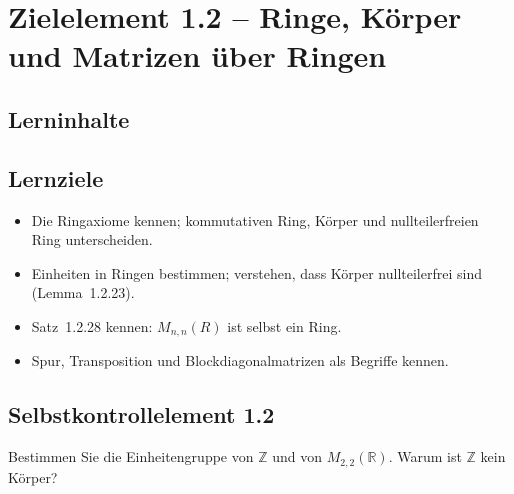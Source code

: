 \documentclass[a4paper,12pt]{article}
\begin{document}
\section*{Zielelement 1.2 -- Ringe, Körper und Matrizen über Ringen}

\subsection*{Lerninhalte}
\begin{center}
\end{center}

\subsection*{Lernziele}
\begin{itemize}
  \item Die Ringaxiome kennen; kommutativen Ring, Körper und nullteilerfreien Ring unterscheiden.
  \item Einheiten in Ringen bestimmen; verstehen, dass Körper nullteilerfrei sind (Lemma~1.2.23).
  \item Satz~1.2.28 kennen: $M_{n,n}(R)$ ist selbst ein Ring.
  \item Spur, Transposition und Blockdiagonalmatrizen als Begriffe kennen.
\end{itemize}

\subsection*{Selbstkontrollelement 1.2}
Bestimmen Sie die Einheitengruppe von $\mathbb{Z}$ und von $M_{2,2}(\mathbb{R})$.
Warum ist $\mathbb{Z}$ kein Körper?

\newpage
\end{document}
